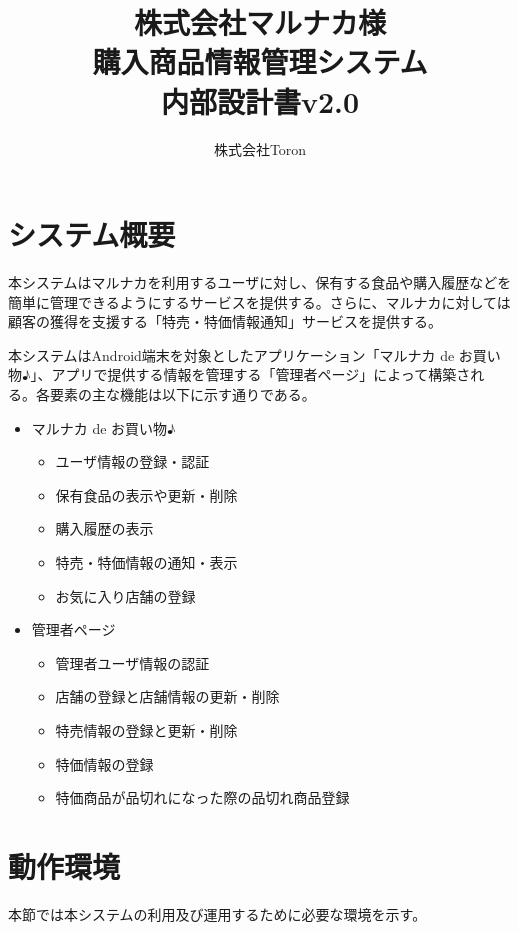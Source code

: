 \documentclass[a4j]{jarticle}
\title{
\vspace{30mm}
株式会社マルナカ様\\
購入商品情報管理システム\\
内部設計書v2.0
\vspace{90mm}
}
\author{
株式会社Toron
}
\begin{document}
\maketitle
\newpage
\tableofcontents
\newpage


\section{システム概要}
本システムはマルナカを利用するユーザに対し、保有する食品や購入履歴などを簡単に管理できるようにするサービスを提供する。さらに、マルナカに対しては顧客の獲得を支援する「特売・特価情報通知」サービスを提供する。\par
本システムはAndroid端末を対象としたアプリケーション「マルナカ de お買い物♪」、アプリで提供する情報を管理する「管理者ページ」によって構築される。各要素の主な機能は以下に示す通りである。
\begin{itemize}
\item マルナカ de お買い物♪

\begin{itemize}
\item ユーザ情報の登録・認証
\item 保有食品の表示や更新・削除
\item 購入履歴の表示
\item 特売・特価情報の通知・表示
\item お気に入り店舗の登録
\end{itemize}

\item 管理者ページ

\begin{itemize}
\item 管理者ユーザ情報の認証
\item 店舗の登録と店舗情報の更新・削除
\item 特売情報の登録と更新・削除
\item 特価情報の登録
\item 特価商品が品切れになった際の品切れ商品登録
\end{itemize}

\end{itemize}
\section{動作環境}
本節では本システムの利用及び運用するために必要な環境を示す。
\end{document}
